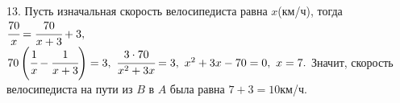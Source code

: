 13. Пусть изначальная скорость велосипедиста равна $x$(км/ч), тогда $\cfrac{70}{x}=\cfrac{70}{x+3}+3,$\\$
70\left(\cfrac{1}{x}-\cfrac{1}{x+3}\right)=3,\ \cfrac{3\cdot70}{x^2+3x}=3,\ x^2+3x-70=0,\ x=7.$ Значит, скорость велосипедиста на пути из $B$ в $A$ была равна $7+3=10$км/ч.\\
